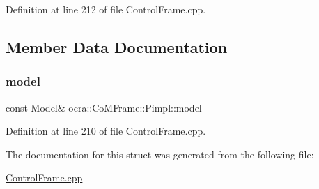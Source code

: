 Definition at line 212 of file Control\+Frame.\+cpp.



\subsection{Member Data Documentation}
\hypertarget{structocra_1_1CoMFrame_1_1Pimpl_aa6727f07a45efaed605571d416ff4727}{}\label{structocra_1_1CoMFrame_1_1Pimpl_aa6727f07a45efaed605571d416ff4727} 
\subsubsection{\texorpdfstring{model}{model}}
{\footnotesize\ttfamily const Model\& ocra\+::\+Co\+M\+Frame\+::\+Pimpl\+::model}



Definition at line 210 of file Control\+Frame.\+cpp.



The documentation for this struct was generated from the following file\+:\begin{DoxyCompactItemize}
\item 
\hyperlink{ControlFrame_8cpp}{Control\+Frame.\+cpp}\end{DoxyCompactItemize}
